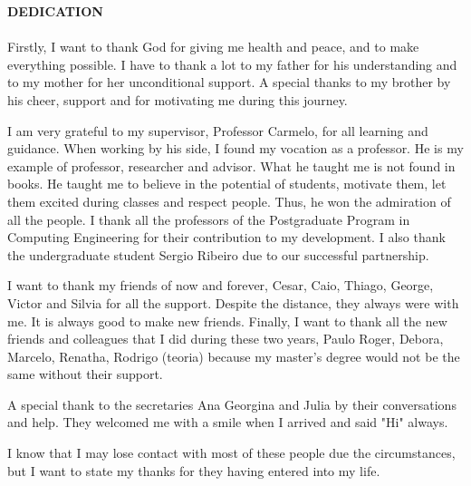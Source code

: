 \begin{flushbottom}
\textbf{DEDICATION}
\\
\\
Firstly, I want to thank God for giving me health and peace, and to make everything possible. I have to thank a lot to my father for his understanding and to my mother for her unconditional support. A special thanks to my brother by his cheer, support and for motivating me during this journey.

I am very grateful to my supervisor, Professor Carmelo, for all learning and guidance. When working by his side, I found my vocation as a professor. He is my example of professor, researcher and advisor. What he taught me is not found in books. He taught me to believe in the potential of students, motivate them, let them excited during classes and respect people. Thus, he won the admiration of all the people. I thank all the professors of the Postgraduate Program in Computing Engineering for their contribution to my development. I also thank the undergraduate student Sergio Ribeiro due to our successful partnership.

I want to thank my friends of now and forever, Cesar, Caio, Thiago, George, Victor and Silvia for all the support. Despite the distance, they always were with me. It is always good to make new friends. Finally, I want to thank all the new friends and colleagues that I did during these two years, Paulo Roger, Debora, Marcelo, Renatha, Rodrigo (teoria) because my master's degree would not be the same without their support.

A special thank to the secretaries Ana Georgina and Julia by their conversations and help. They welcomed me with a smile when I arrived and said "Hi" always.

I know that I may lose contact with most of these people due the circumstances, but I want to state my thanks for they having entered into my life.
\end{flushbottom}
\newpage
